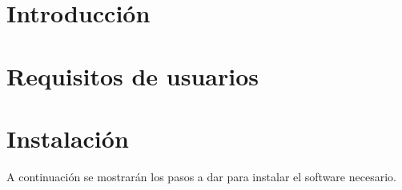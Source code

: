 
\section{Introducción}

\section{Requisitos de usuarios}

\section{Instalación}
A continuación se mostrarán los pasos a dar para instalar el software necesario.

